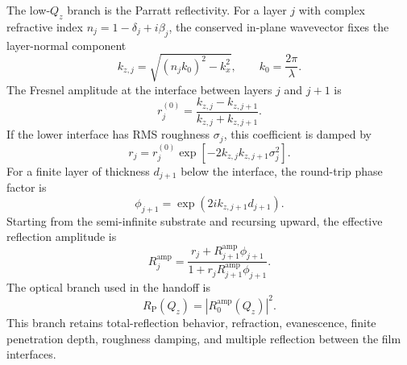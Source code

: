 \documentclass[11pt]{article}
\begin{document}
The low-$Q_z$ branch is the Parratt reflectivity.\cite{Parratt1954} For a layer
$j$ with complex refractive index $n_j=1-\delta_j+i\beta_j$, the conserved
in-plane wavevector fixes the layer-normal component
\begin{equation}
  k_{z,j}=\sqrt{(n_j k_0)^2-k_x^2},
  \qquad
  k_0=\frac{2\pi}{\lambda}.
  \label{eq:si_parratt_kz}
\end{equation}
The Fresnel amplitude at the interface between layers $j$ and $j+1$ is
\begin{equation}
  r_j^{(0)}=\frac{k_{z,j}-k_{z,j+1}}{k_{z,j}+k_{z,j+1}}.
  \label{eq:si_parratt_interface}
\end{equation}
If the lower interface has RMS roughness $\sigma_j$, this coefficient is damped
by
\begin{equation}
  r_j=r_j^{(0)}\exp\!\left[-2k_{z,j}k_{z,j+1}\sigma_j^2\right].
  \label{eq:si_parratt_roughness}
\end{equation}
For a finite layer of thickness $d_{j+1}$ below the interface, the round-trip
phase factor is
\begin{equation}
  \phi_{j+1}=\exp\!\left(2ik_{z,j+1}d_{j+1}\right).
  \label{eq:si_parratt_phase}
\end{equation}
Starting from the semi-infinite substrate and recursing upward, the effective
reflection amplitude is
\begin{equation}
  R_j^{\mathrm{amp}}
  =
  \frac{r_j+R_{j+1}^{\mathrm{amp}}\phi_{j+1}}
       {1+r_jR_{j+1}^{\mathrm{amp}}\phi_{j+1}}.
  \label{eq:si_parratt_recursion}
\end{equation}
The optical branch used in the handoff is
\begin{equation}
  R_{\mathrm P}(Q_z)=\left|R_0^{\mathrm{amp}}(Q_z)\right|^2.
  \label{eq:si_parratt_reflectivity}
\end{equation}
This branch retains total-reflection behavior, refraction, evanescence, finite
penetration depth, roughness damping, and multiple reflection between the film
interfaces.
\end{document}
